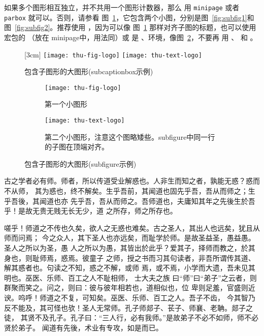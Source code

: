 如果多个图形相互独立，并不共用一个图形计数器，那么
用 \texttt{minipage} 或者\texttt{parbox} 就可以。否则，请参看
图~\ref{fig:big1-subcaptionbox}，它包含两个小图，分别是图~\ref{fig:subfig1}和
图~\ref{fig:subfig2}。推荐使用 ，因为可以像
图~\ref{fig:big1-subcaptionbox} 那样对齐子图的标题，也可以使用 
宏包的 （放在 minipage中，用法同）或
是  、环境，像图~\ref{fig:big1-subfigure}，不要再
用 、 和 。

\begin{figure}[h]
  \centering%
  [3cm] %
    {\texttt{[image: thu-fig-logo]}}%
  \hspace{4em}%
      {\texttt{[image: thu-text-logo]}}
  \caption{包含子图形的大图形(subcaptionbox示例)}
  \label{fig:big1-subcaptionbox}
\end{figure}
\begin{figure}[h]
  \centering%
  \begin{subfigure}{3cm}
    \texttt{[image: thu-fig-logo]}
    \caption{第一个小图形}
  \end{subfigure}%
  \hspace{4em}%
  \begin{subfigure}{0.5\textwidth}
    \texttt{[image: thu-text-logo]}
    \caption{第二个小图形，注意这个图略矮些。subfigure中同一行的子图在顶端对齐。}
  \end{subfigure}
  \caption{包含子图形的大图形(subfigure示例)}
  \label{fig:big1-subfigure}
\end{figure}

古之学者必有师。师者，所以传道受业解惑也。人非生而知之者，孰能无惑？惑而不从师，
其为惑也，终不解矣。生乎吾前，其闻道也固先乎吾，吾从而师之；生乎吾後，其闻道也亦
先乎吾，吾从而师之。吾师道也，夫庸知其年之先後生於吾乎！是故无贵无贱无长无少，道
之所存，师之所存也。

嗟乎！师道之不传也久矣，欲人之无惑也难矣。古之圣人，其出人也远矣，犹且从师而问焉；
今之众人，其下圣人也亦远矣，而耻学於师。是故圣益圣，愚益愚。圣人之所以为圣，愚
人之所以为愚，其皆出於此乎？爱其子，择师而教之，於其身也，则耻师焉，惑焉。彼童子
之师，授之书而习其句读者，非吾所谓传其道、解其惑者也。句读之不知，惑之不解，或师
焉，或不焉，小学而大遗，吾未见其明也。巫医、乐师、百工之人不耻相师，  士大夫之族
曰“师”曰“弟子”之云者，则群聚而笑之。问之，则曰：彼与彼年相若也，道相似也，位
卑则足羞，官盛则近谀。呜呼！师道之不复，可知矣。巫医、乐师、百工之人。吾子不齿，
今其智乃反不能及，其可怪也欤！圣人无常师。孔子师郯子、苌子、师襄、老聃。郯子之徒，
其贤不及孔子。孔子曰：“三人行，必有我师。”是故弟子不必不如师，师不必贤於弟子。
闻道有先後，术业有专攻，如是而已。

